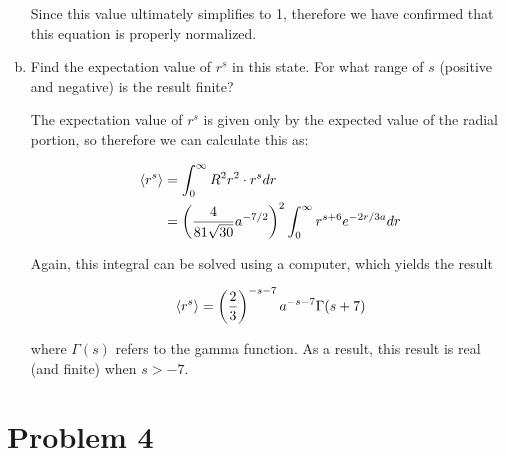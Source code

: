 \documentclass[10pt]{article}
\begin{document}
\begin{enumerate}[(a)]
\begin{solution}
            Since this value ultimately simplifies to 1, therefore we have confirmed that this equation is properly normalized. 
        \end{solution}
        \item Find the expectation value of $r^s$ in this state. For what range of $s$ (positive and negative) is the result finite?
        
        \begin{solution}
            The expectation value of $r^s$ is given only by the expected value of the radial portion, so therefore we can calculate this as:

            \begin{align*}
                \langle r^s \rangle &= \int_0^\infty R^2 r^2 \cdot r^s dr\\
                &= \left(\frac{4}{81 \sqrt{30}} a^{-7/2}\right)^2 \int_0^\infty r^{s + 6} e^{-2r/3a} dr
            \end{align*}

            Again, this integral can be solved using a computer, which yields the result 

            \[ \langle r^s \rangle = \left( \frac{2}{3}\right)^{-s-7} a^{-s-7}\Gamma(s + 7)\] 

            where $\Gamma(s)$ refers to the gamma function. As a result, this result is real (and finite) when $s > -7$. 
        \end{solution}
    \end{enumerate}

    \pagebreak

    \section*{Problem 4} 
\end{document}
